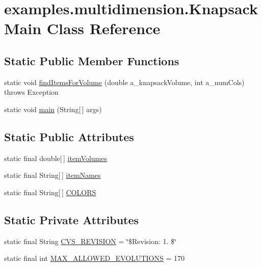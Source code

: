 \hypertarget{classexamples_1_1multidimension_1_1_knapsack_main}{\section{examples.\-multidimension.\-Knapsack\-Main Class Reference}
\label{classexamples_1_1multidimension_1_1_knapsack_main}
}
\subsection*{Static Public Member Functions}
\begin{DoxyCompactItemize}
\item 
static void \hyperlink{classexamples_1_1multidimension_1_1_knapsack_main_aebec04347fddab0a4ac7353ff1b46063}{find\-Items\-For\-Volume} (double a\-\_\-knapsack\-Volume, int a\-\_\-num\-Cols)  throws Exception 
\item 
static void \hyperlink{classexamples_1_1multidimension_1_1_knapsack_main_a003d2df1aa5de1905c1fe77ebb68f8ec}{main} (String\mbox{[}$\,$\mbox{]} args)
\end{DoxyCompactItemize}
\subsection*{Static Public Attributes}
\begin{DoxyCompactItemize}
\item 
static final double\mbox{[}$\,$\mbox{]} \hyperlink{classexamples_1_1multidimension_1_1_knapsack_main_a06ff6c3f26e1f3920d184f6c6a97d1e9}{item\-Volumes}
\item 
static final String\mbox{[}$\,$\mbox{]} \hyperlink{classexamples_1_1multidimension_1_1_knapsack_main_ac612fc688cb3e65053186c30ea14be8c}{item\-Names}
\item 
static final String\mbox{[}$\,$\mbox{]} \hyperlink{classexamples_1_1multidimension_1_1_knapsack_main_a442e9db06b68f6748e7ba23b71d9d7ac}{C\-O\-L\-O\-R\-S}
\end{DoxyCompactItemize}
\subsection*{Static Private Attributes}
\begin{DoxyCompactItemize}
\item 
static final String \hyperlink{classexamples_1_1multidimension_1_1_knapsack_main_a2bffa782bdc5f8ab8de71ac440e42d30}{C\-V\-S\-\_\-\-R\-E\-V\-I\-S\-I\-O\-N} = \char`\"{}\$Revision\-: 1. \$\char`\"{}
\item 
static final int \hyperlink{classexamples_1_1multidimension_1_1_knapsack_main_a597b33abec9626da55cbb5865a1a5e0b}{M\-A\-X\-\_\-\-A\-L\-L\-O\-W\-E\-D\-\_\-\-E\-V\-O\-L\-U\-T\-I\-O\-N\-S} = 170
\end{DoxyCompactItemize}


